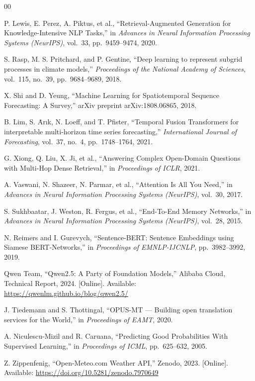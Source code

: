 \documentclass[conference]{IEEEtran}
\begin{document}
\balance
\begin{thebibliography}{00}

P. Lewis, E. Perez, A. Piktus, et al., ``Retrieval-Augmented Generation for Knowledge-Intensive NLP Tasks,'' in \textit{Advances in Neural Information Processing Systems (NeurIPS)}, vol.~33, pp.~9459--9474, 2020.

S. Rasp, M. S. Pritchard, and P. Gentine, ``Deep learning to represent subgrid processes in climate models,'' \textit{Proceedings of the National Academy of Sciences}, vol.~115, no.~39, pp.~9684--9689, 2018.

X. Shi and D. Yeung, ``Machine Learning for Spatiotemporal Sequence Forecasting: A Survey,'' arXiv preprint arXiv:1808.06865, 2018.

B. Lim, S. \.{A}r\i{}k, N. Loeff, and T. Pfister, ``Temporal Fusion Transformers for interpretable multi-horizon time series forecasting,'' \textit{International Journal of Forecasting}, vol.~37, no.~4, pp.~1748--1764, 2021.

G. Xiong, Q. Liu, X. Ji, et al., ``Answering Complex Open-Domain Questions with Multi-Hop Dense Retrieval,'' in \textit{Proceedings of ICLR}, 2021.

A. Vaswani, N. Shazeer, N. Parmar, et al., ``Attention Is All You Need,'' in \textit{Advances in Neural Information Processing Systems (NeurIPS)}, vol.~30, 2017.

S. Sukhbaatar, J. Weston, R. Fergus, et al., ``End-To-End Memory Networks,'' in \textit{Advances in Neural Information Processing Systems (NeurIPS)}, vol.~28, 2015.

N. Reimers and I. Gurevych, ``Sentence-BERT: Sentence Embeddings using Siamese BERT-Networks,'' in \textit{Proceedings of EMNLP-IJCNLP}, pp.~3982--3992, 2019.

Qwen Team, ``Qwen2.5: A Party of Foundation Models,'' Alibaba Cloud, Technical Report, 2024. [Online]. Available: \url{https://qwenlm.github.io/blog/qwen2.5/}

J. Tiedemann and S. Thottingal, ``OPUS-MT --- Building open translation services for the World,'' in \textit{Proceedings of EAMT}, 2020.

A. Niculescu-Mizil and R. Caruana, ``Predicting Good Probabilities With Supervised Learning,'' in \textit{Proceedings of ICML}, pp.~625--632, 2005.

Z. Zippenfenig, ``Open-Meteo.com Weather API,'' Zenodo, 2023. [Online]. Available: \url{https://doi.org/10.5281/zenodo.7970649}

\end{thebibliography}
\end{document}
